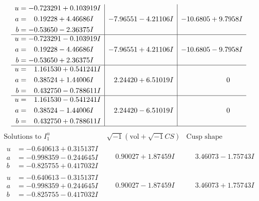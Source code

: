 \documentclass[1p]{elsarticle_modified}
\theoremstyle{definition}
\newcommand{\I}{\sqrt{-1}}
\begin{document}
$$\begin{array}{c|c|c}
\begin{aligned}
u &= -0.723291 + 0.103919 I \\
a &= \phantom{-}0.19228 + 4.46686 I \\
b &= -0.53650 - 2.36375 I\end{aligned}
 & -7.96551 - 4.21106 I & -10.6805 + 9.7958 I \\ \hline\begin{aligned}
u &= -0.723291 - 0.103919 I \\
a &= \phantom{-}0.19228 - 4.46686 I \\
b &= -0.53650 + 2.36375 I\end{aligned}
 & -7.96551 + 4.21106 I & -10.6805 - 9.7958 I \\ \hline\begin{aligned}
u &= \phantom{-}1.161530 + 0.541241 I \\
a &= \phantom{-}0.38524 + 1.44006 I \\
b &= \phantom{-}0.432750 - 0.788611 I\end{aligned}
 & \phantom{-}2.24420 + 6.51019 I & \phantom{-0.000000 } 0 \\ \hline\begin{aligned}
u &= \phantom{-}1.161530 - 0.541241 I \\
a &= \phantom{-}0.38524 - 1.44006 I \\
b &= \phantom{-}0.432750 + 0.788611 I\end{aligned}
 & \phantom{-}2.24420 - 6.51019 I & \phantom{-0.000000 } 0\\
 \hline 
 \end{array}$$\newpage$$\begin{array}{c|c|c}  
\text{Solutions to }I^u_{1}& \I (\text{vol} + \sqrt{-1}CS) & \text{Cusp shape}\\
 \hline 
\begin{aligned}
u &= -0.640613 + 0.315137 I \\
a &= -0.998359 - 0.244645 I \\
b &= -0.825755 + 0.417032 I\end{aligned}
 & \phantom{-}0.90027 + 1.87459 I & \phantom{-}3.46073 - 1.75743 I \\ \hline\begin{aligned}
u &= -0.640613 - 0.315137 I \\
a &= -0.998359 + 0.244645 I \\
b &= -0.825755 - 0.417032 I\end{aligned}
 & \phantom{-}0.90027 - 1.87459 I & \phantom{-}3.46073 + 1.75743 I \\ \hline\begin{aligned}

\end{aligned}
\end{array}$$
\end{document}

